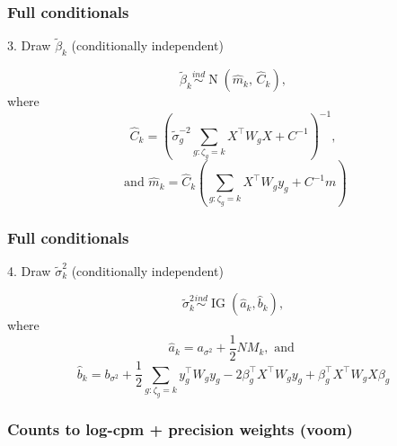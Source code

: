 \documentclass[handout]{beamer}
\newcommand{\op}{\operatorname}
\newcommand{\ind}{\stackrel{ind}{\sim}}
\begin{document}
\begin{frame}%
  \frametitle{Full conditionals}
  3. Draw $\tilde{\beta}_k$ (conditionally independent)

  \[\tilde{\beta}_k \ind \op{N}(\hat{m}_k,\, \hat{C}_k),\]
  where
  \[\hat{C}_k= \left( \tilde{\sigma}^{-2}_g\sum_{g:\zeta_g=k}
    X^\top W_g X + C^{-1} \right)^{-1},\]
  \[\mbox{ and }\hat{m}_k=\hat{C}_k \left(\sum_{g:\zeta_g=k} X^\top W_g y_g +
        C^{-1}m \right)\]
\end{frame}

\begin{frame}%
  \frametitle{Full conditionals}
  4. Draw $\tilde{\sigma}_k^2$ (conditionally independent)

  \[\tilde{\sigma}_k^2 \ind \op{IG}(\hat{a}_k,\hat{b}_k),\]
  where
  \[\hat{a}_k = a_{\sigma^2} + \frac{1}{2}NM_k,\mbox{ and }\]
  \[\hat{b}_k= b_{\sigma^2} + \frac{1}{2}\sum_{g:\zeta_g=k}y_g^\top W_g y_g -2 \beta_g^\top X^\top W_g y_g  +\beta_g^\top X^\top W_g X \beta_g\]
\end{frame}


\begin{frame}%
  \frametitle{Counts to log-cpm + precision weights (voom)}
  \centering
\end{frame}
\end{document}
